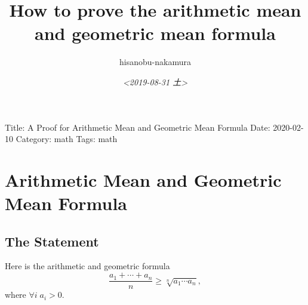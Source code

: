 \documentclass{article}
\author{hisanobu-nakamura}
\date{\textit{<2019-08-31 土>}}
\title{How to prove the arithmetic mean and geometric mean formula}
\begin{document}
\maketitle
Title: A Proof for Arithmetic Mean and Geometric Mean Formula
Date: 2020-02-10
Category: math
Tags: math

\section{Arithmetic Mean and Geometric Mean Formula}
\label{sec-1}
\subsection{The Statement}
\label{sec-1-1}
Here is the arithmetic and geometric formula
\begin{equation*}
\label{ }
\frac{a_1 + \cdots + a_n}{n} \ge \sqrt[n]{a_1\cdots a_n},
\end{equation*}
where $\forall i \; a_i > 0$.
\end{document}
